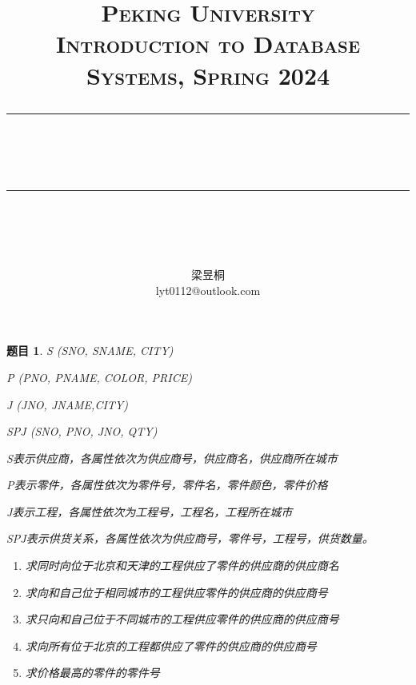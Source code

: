 \documentclass[12pt]{article} %
\theoremstyle{problemstyle} %
\newtheorem{problem}{题目} %
\newcommand{\horrule}[1]{\rule[0.5ex]{\linewidth}{#1}} 	%
\begin{document}
\title{
{\normalfont\normalsize\textsc{
Peking University\\
Introduction to Database Systems, Spring 2024 \\[25pt]}}
\horrule{0.5pt}\\
\horrule{1.8pt}\\[20pt]
}
\author{梁昱桐\\lyt0112@outlook.com}

\begin{titlepage}
\maketitle
\vspace{30pt}


\thispagestyle{empty}
\end{titlepage}


\newpage
\setcounter{page}{1}

\begin{problem}
S (SNO, SNAME, CITY)

P (PNO, PNAME, COLOR, PRICE)

J (JNO, JNAME,CITY)

SPJ (SNO, PNO, JNO, QTY)

S表示供应商，各属性依次为供应商号，供应商名，供应商所在城市

P表示零件，各属性依次为零件号，零件名，零件颜色，零件价格

J表示工程，各属性依次为工程号，工程名，工程所在城市

SPJ表示供货关系，各属性依次为供应商号，零件号，工程号，供货数量。

\begin{enumerate}
  \item 求同时向位于北京和天津的工程供应了零件的供应商的供应商名
  \item 求向和自己位于相同城市的工程供应零件的供应商的供应商号
  \item 求只向和自己位于不同城市的工程供应零件的供应商的供应商号
  \item 求向所有位于北京的工程都供应了零件的供应商的供应商号
  \item 求价格最高的零件的零件号
\end{enumerate}

\end{problem}
\end{document}
